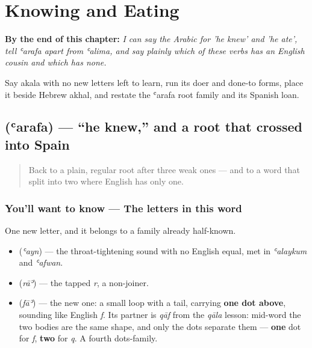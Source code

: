 
\chapter{Knowing and Eating}
\label{ch:ar-knowing-and-eating}

\begin{chapteropening}
\textbf{By the end of this chapter:} \emph{I can say the Arabic for 'he knew' and 'he ate', tell ʿarafa apart from ʿalima, and say plainly which of these verbs has an English cousin and which has none.}

Say akala with no new letters left to learn, run its doer and done-to forms, place it beside Hebrew akhal, and restate the ʿarafa root family and its Spanish loan.
\end{chapteropening}

\section[\texorpdfstring{\ar{عرف} (ʿarafa)}{عرف (ʿarafa)}]{ (ʿarafa) — \textquotedblleft{}he knew,\textquotedblright{} and a root that crossed into Spain}

\label{lesson:AR-C30-arafa}



\begin{quote}
Back to a plain, regular root after three weak ones — and to a word that split into two where English has only one.
\end{quote}

\subsection*{You'll want to know — The letters in this word}
One new letter, and it belongs to a family already half-known.

\begin{itemize}
\raggedright
  \item \textbf{} (\emph{ʿayn}) — the throat-tightening sound with no English equal, met in \emph{ʿalaykum} and \emph{ʿafwan}.
  \item \textbf{} (\emph{rāʾ}) — the tapped \emph{r}, a non-joiner.
  \item \textbf{} (\emph{fāʾ}) — the new one: a small loop with a tail, carrying \textbf{one dot above}, sounding like English \emph{f}. Its partner is \emph{qāf} from the \emph{qāla} lesson: mid-word the two bodies are the same shape, and only the dots separate them — \textbf{one} dot for \emph{f}, \textbf{two} for \emph{q}. A fourth dots-family.
\end{itemize}

